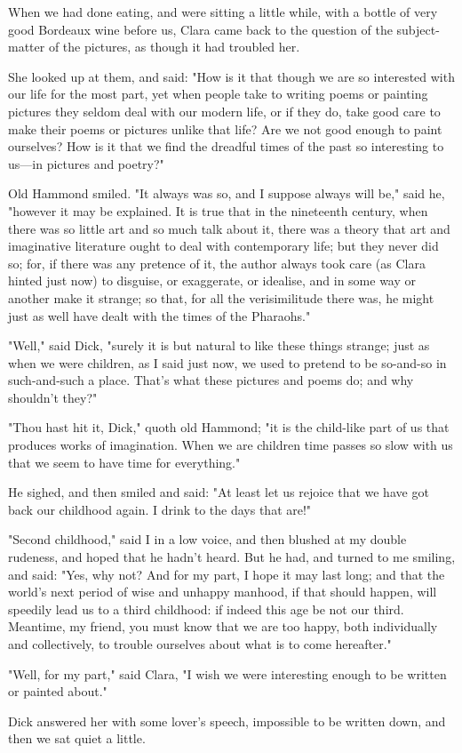 When we had done eating, and were sitting a little while, with a bottle
of very good Bordeaux wine before us, Clara came back to the question of
the subject-matter of the pictures, as though it had troubled her.

She looked up at them, and said: "How is it that though we are so
interested with our life for the most part, yet when people take to
writing poems or painting pictures they seldom deal with our modern
life, or if they do, take good care to make their poems or pictures
unlike that life? Are we not good enough to paint ourselves? How is it
that we find the dreadful times of the past so interesting to us---in
pictures and poetry?"

Old Hammond smiled. "It always was so, and I suppose always will be,"
said he, "however it may be explained. It is true that in the nineteenth
century, when there was so little art and so much talk about it, there
was a theory that art and imaginative literature ought to deal with
contemporary life; but they never did so; for, if there was any pretence
of it, the author always took care (as Clara hinted just now) to
disguise, or exaggerate, or idealise, and in some way or another make it
strange; so that, for all the verisimilitude there was, he might just as
well have dealt with the times of the Pharaohs."

"Well," said Dick, "surely it is but natural to like these things
strange; just as when we were children, as I said just now, we used to
pretend to be so-and-so in such-and-such a place. That's what these
pictures and poems do; and why shouldn't they?"

"Thou hast hit it, Dick," quoth old Hammond; "it is the child-like part
of us that produces works of imagination. When we are children time
passes so slow with us that we seem to have time for everything."

He sighed, and then smiled and said: "At least let us rejoice that we
have got back our childhood again. I drink to the days that are!"

"Second childhood," said I in a low voice, and then blushed at my double
rudeness, and hoped that he hadn't heard. But he had, and turned to me
smiling, and said: "Yes, why not? And for my part, I hope it may last
long; and that the world's next period of wise and unhappy manhood, if
that should happen, will speedily lead us to a third childhood: if
indeed this age be not our third. Meantime, my friend, you must know
that we are too happy, both individually and collectively, to trouble
ourselves about what is to come hereafter."

"Well, for my part," said Clara, "I wish we were interesting enough to
be written or painted about."

Dick answered her with some lover's speech, impossible to be written
down, and then we sat quiet a little.
